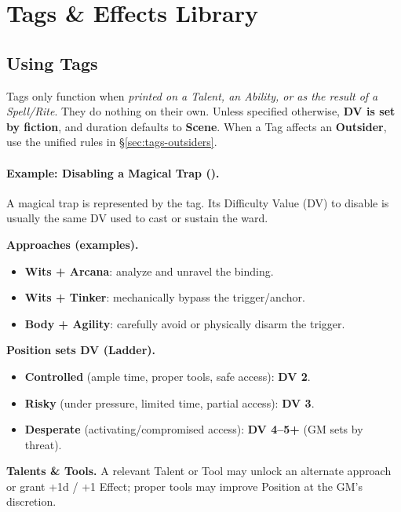 

\section{Tags \& Effects Library}
\label{sec:tags}

\subsection{Using Tags}
Tags only function when \emph{printed on a Talent, an Ability, or as the result of a Spell/Rite}. 
They do nothing on their own. 
Unless specified otherwise, \textbf{DV is set by fiction}, and duration defaults to \textbf{Scene}. 
When a Tag affects an \textbf{Outsider}, use the unified rules in \S\ref{sec:tags-outsiders}.

\paragraph{Example: Disabling a Magical Trap (\WARD).}
A magical trap is represented by the \WARD tag. Its Difficulty Value (DV) to disable is usually the same DV used to cast or sustain the ward.

\textbf{Approaches (examples).}
\begin{itemize}
  \item \textbf{Wits + Arcana}: analyze and unravel the binding.
  \item \textbf{Wits + Tinker}: mechanically bypass the trigger/anchor.
  \item \textbf{Body + Agility}: carefully avoid or physically disarm the trigger.
\end{itemize}

\textbf{Position sets DV (Ladder).}
\begin{itemize}
  \item \textbf{Controlled} (ample time, proper tools, safe access): \textbf{DV 2}.
  \item \textbf{Risky} (under pressure, limited time, partial access): \textbf{DV 3}.
  \item \textbf{Desperate} (activating/compromised access): \textbf{DV 4–5+} (GM sets by threat).
\end{itemize}

\textbf{Talents \& Tools.} A relevant Talent or Tool may unlock an alternate approach or grant +1d / +1 Effect; proper tools may improve Position at the GM’s discretion.

